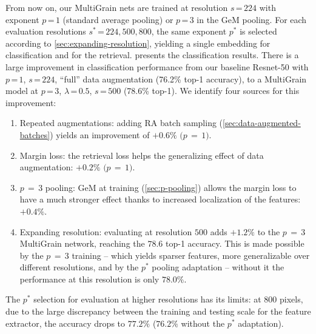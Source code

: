 From now on, our MultiGrain nets are trained at resolution $s$\,=\,$224$ with exponent $p$\,=\,$1$ (standard average pooling) or $p$\,=\,$3$ in the GeM pooling. 
For each evaluation resolutions $s^*$\,=\,$224, 500, 800$, the same exponent $p^*$ is selected according to \cref{sec:expanding-resolution}, yielding a single embedding for classification and for the retrieval. 
%
%
 presents the classification results. 
There is a large improvement in classification performance from 
our baseline Resnet-50 with $p$\,=\,$1$, $s$\,=\,$224$, ``full'' data augmentation (76.2\% top-1 accuracy), 
to a MultiGrain model at $p$\,=\,$3$, $\lambda$\,=\,$0.5$, $s$\,=\,$500$ (78.6\% top-1).
We identify four sources for this improvement:
\begin{enumerate}
\item Repeated augmentations: adding RA batch sampling (\cref{sec:data-augmented-batches}) yields an improvement of $+0.6 \%$ $(p$\,$=$\,$1)$.
\item Margin loss: the retrieval loss helps the generalizing effect of data augmentation: $+0.2 \%$ $(p$\,$=$\,$1)$.
\item $p$\,$=$\,$3$ pooling: GeM at training (\cref{sec:p-pooling}) allows the margin loss to have a much stronger effect thanks to increased localization of the features: $+0.4\%$.
\item Expanding resolution: evaluating at resolution $500$ adds $+1.2\%$ to the $p$\,$=$\,$3$ MultiGrain network, reaching the $78.6$ top-1 accuracy. 
This is made possible by the $p$\,$=$\,$3$ training -- which yields sparser features, more generalizable over different resolutions, and by the $p^*$ pooling adaptation -- without it the performance at this resolution is only $78.0\%$.
\end{enumerate}

The $p^*$ selection for evaluation at higher resolutions has its limits: at $800$ pixels, due to the large discrepancy between the training and testing scale for the feature extractor, the accuracy drops to $77.2\%$ ($76.2\%$ without the $p^*$ adaptation).
%

\begin{table}[t]
\centering
\caption{\label{tab:classifres}
	ImageNet 2012 validation performance at top-1~/~top-5 accuracies ($\%$). 
    Resnet-50 is a %
    classification baseline trained with cross-entropy with our training schedule, data augmentation, and uniform batch sampling. 
    MultiGrain uses the same Resnet-50 trunk. 
%
At resolutions $s^*$\,$>$\,224 we evaluate with exponent $p^*$ as described in \cref{sec:expanding-resolution}. %
}
\vspace{-2pt}
{\small
}
\vspace{-2pt}
\end{table}

